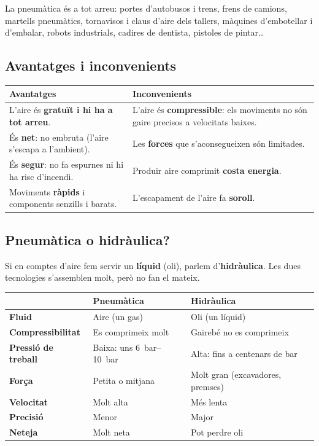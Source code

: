 \begin{sabiesque}
La pneumàtica és a tot arreu: portes d'autobusos i trens, frens de camions, martells pneumàtics, tornavisos i claus d'aire dels tallers, màquines d'embotellar i d'embalar, robots industrials, cadires de dentista, pistoles de pintar\ldots
\end{sabiesque}

\subsection*{Avantatges i inconvenients}

\begin{center}
\renewcommand{\arraystretch}{1.45}
\begin{tabular}{@{}p{7.7cm}p{7.7cm}@{}}
\toprule
\textcolor{verd}{\textbf{Avantatges}} & \textcolor{vermell}{\textbf{Inconvenients}}\\
\midrule
L'aire és \textbf{gratuït i hi ha a tot arreu}. & L'aire és \textbf{compressible}: els moviments no són gaire precisos a velocitats baixes.\\
És \textbf{net}: no embruta (l'aire s'escapa a l'ambient).& Les \textbf{forces} que s'aconsegueixen són limitades.\\
És \textbf{segur}: no fa espurnes ni hi ha risc d'incendi.& Produir aire comprimit \textbf{costa energia}.\\
Moviments \textbf{ràpids} i components senzills i barats.& L'escapament de l'aire fa \textbf{soroll}.\\
\bottomrule
\end{tabular}
\end{center}

\subsection*{Pneumàtica o hidràulica?}

Si en comptes d'aire fem servir un \textbf{líquid} (oli), parlem d'\textbf{hidràulica}. Les dues tecnologies s'assemblen molt, però no fan el mateix.

\begin{center}
\renewcommand{\arraystretch}{1.45}
\begin{tabular}{@{}lp{5.6cm}p{5.6cm}@{}}
\toprule
 & \textbf{Pneumàtica} & \textbf{Hidràulica}\\
\midrule
\textbf{Fluid} & Aire (un gas) & Oli (un líquid)\\
\textbf{Compressibilitat} & Es comprimeix molt & Gairebé no es comprimeix\\
\textbf{Pressió de treball} & Baixa: uns \SIrange{6}{10}{\bar} & Alta: fins a centenars de bar\\
\textbf{Força} & Petita o mitjana & Molt gran (excavadores, premses)\\
\textbf{Velocitat} & Molt alta & Més lenta\\
\textbf{Precisió} & Menor & Major\\
\textbf{Neteja} & Molt neta & Pot perdre oli\\
\bottomrule
\end{tabular}
\end{center}

